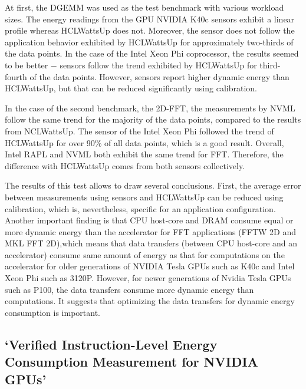 At first, the DGEMM was used as the test benchmark with various
workload sizes. The energy readings from the GPU NVIDIA K40c
sensors exhibit a linear profile whereas HCLWattsUp does not.
Moreover, the sensor does not follow the application behavior
exhibited by HCLWattsUp for approximately two-thirds of the data
points. In the case of the Intel Xeon Phi coprocessor, the results
seemed to be better $-$ sensors follow the trend exhibited by
HCLWattsUp for third-fourth of the data points. However, sensors
report higher dynamic energy than HCLWattsUp, but that can be
reduced significantly using calibration.

In the case of the second benchmark, the 2D-FFT, the measurements
by NVML follow the same trend for the majority of the data points,
compared to the results from NCLWattsUp. The sensor of the Intel
Xeon Phi followed the trend of HCLWattsUp for over 90\% of all
data points, which is a good result. Overall, Intel RAPL and NVML
both exhibit the same trend for FFT\@. Therefore, the difference
with HCLWattsUp comes from both sensors collectively.

The results of this test allows to draw several conclusions.
First, the average error between measurements using sensors and
HCLWattsUp can be reduced using calibration, which is,
nevertheless, specific for an application configuration. Another
important finding is that CPU host-core and DRAM consume equal
or more dynamic energy than the accelerator for FFT applications
(FFTW 2D and MKL FFT 2D),which means that data transfers (between
CPU host-core and an accelerator) consume same amount of energy
as that for computations on the accelerator for older generations
of NVIDIA Tesla GPUs such as K40c and Intel Xeon Phi such as 3120P.
However, for newer generations of Nvidia Tesla GPUs such as P100,
the data transfers consume more dynamic energy than computations.
It suggests that optimizing the data transfers for dynamic energy
consumption is important.

\subsection{`Verified Instruction-Level Energy Consumption Measurement
for NVIDIA GPUs'}

